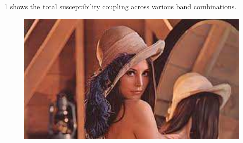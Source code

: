 \Fig\ref{Fig:3:FullSusceptibility} shows the total susceptibility coupling across various band combinations.

\begin{figure}[htbp]
    \begin{center}
        \includegraphics[scale=0.7]{Misc/TODO}
        \caption{}
        \label{Fig:3:FullSusceptibility}
    \end{center}
\end{figure}

